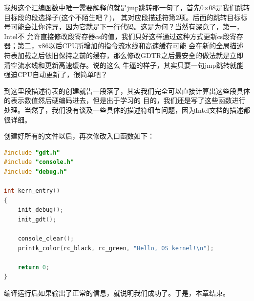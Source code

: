 \par 我想这个汇编函数中唯一需要解释的就是jmp跳转那一句了，首先0×08是我们跳转目标段的段选择子(这个不陌生吧？)，\allowbreak
其对应段描述符第2项。后面的跳转目标标号可能会让你诧异，因为它就是下一行代码。这是为何？当然有深意了，第一，Intel不\allowbreak
允许直接修改段寄存器cs的值，我们只好这样通过这种方式更新cs段寄存器；第二，x86以后CPU所增加的指令流水线和高速缓存可能\allowbreak
会在新的全局描述符表加载之后依旧保持之前的缓存，那么修改GDTR之后最安全的做法就是立即清空流水线和更新高速缓存。说的这么\allowbreak
牛逼的样子，其实只要一句jmp跳转就能强迫CPU自动更新了，很简单吧？

\par 到这里段描述符表的创建就告一段落了，其实我们完全可以直接计算出这些段具体的表示数值然后硬编码进去，但是出于学习的\allowbreak
目的，我们还是写了这些函数进行处理。当然了，我们没有谈及一些具体的描述符细节问题，因为Intel文档的描述都很详细。

\par 创建好所有的文件以后，再次修改入口函数如下：

\begin{lstlisting}[language = C, caption = init/entry.c]
#include "gdt.h"
#include "console.h"
#include "debug.h"

int kern_entry()
{
	init_debug();
	init_gdt();

	console_clear();
	printk_color(rc_black, rc_green, "Hello, OS kernel!\n");

	return 0;
}
\end{lstlisting}

\par 编译运行后如果输出了正常的信息，就说明我们成功了。于是，本章结束。
